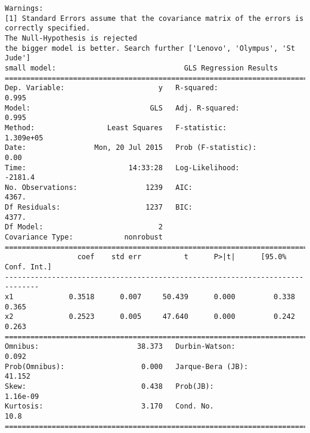 \documentclass{article}
\begin{document}
\begin{verbatim}
Warnings:
[1] Standard Errors assume that the covariance matrix of the errors is correctly specified.
The Null-Hypothesis is rejected
the bigger model is better. Search further ['Lenovo', 'Olympus', 'St Jude']
small model:                              GLS Regression Results                            
==============================================================================
Dep. Variable:                      y   R-squared:                       0.995
Model:                            GLS   Adj. R-squared:                  0.995
Method:                 Least Squares   F-statistic:                 1.309e+05
Date:                Mon, 20 Jul 2015   Prob (F-statistic):               0.00
Time:                        14:33:28   Log-Likelihood:                -2181.4
No. Observations:                1239   AIC:                             4367.
Df Residuals:                    1237   BIC:                             4377.
Df Model:                           2                                         
Covariance Type:            nonrobust                                         
==============================================================================
                 coef    std err          t      P>|t|      [95.0% Conf. Int.]
------------------------------------------------------------------------------
x1             0.3518      0.007     50.439      0.000         0.338     0.365
x2             0.2523      0.005     47.640      0.000         0.242     0.263
==============================================================================
Omnibus:                       38.373   Durbin-Watson:                   0.092
Prob(Omnibus):                  0.000   Jarque-Bera (JB):               41.152
Skew:                           0.438   Prob(JB):                     1.16e-09
Kurtosis:                       3.170   Cond. No.                         10.8
==============================================================================


\end{verbatim}
\end{document}
